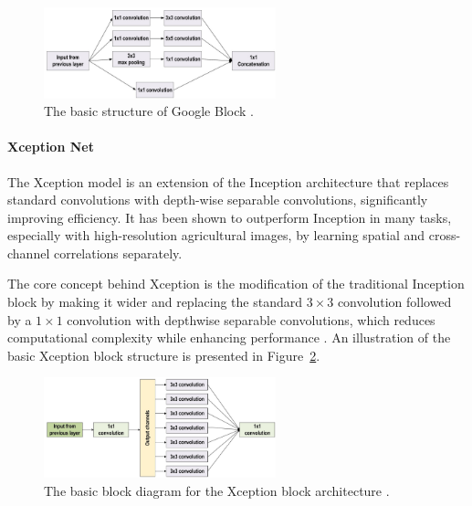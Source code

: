 \begin{figure}[H] %
    \centering
    \includegraphics[width=0.6\textwidth]{chapters/chapter1/images/Figure09.png}
    \caption{The basic structure of Google Block \parencite{alzubaidi2021review}.}
    \label{fig:figure09}
\end{figure}

\paragraph{Xception Net}

The Xception model is an extension of the Inception architecture that replaces standard convolutions with depth-wise separable convolutions, significantly improving efficiency. It has been shown to outperform Inception in many tasks, especially with high-resolution agricultural images, by learning spatial and cross-channel correlations separately.

The core concept behind Xception is the modification of the traditional Inception block by making it wider and replacing the standard $3 \times 3$ convolution followed by a $1 \times 1$ convolution with depthwise separable convolutions, which reduces computational complexity while enhancing performance \parencite{alzubaidi2021review}. An illustration of the basic Xception block structure is presented in Figure~\ref{fig:figure10}.


\begin{figure}[H] %
    \centering
    \includegraphics[width=0.6\textwidth]{chapters/chapter1/images/Figure10.png}
    \caption{The basic block diagram for the Xception block architecture \parencite{alzubaidi2021review}.}
    \label{fig:figure10}
\end{figure}

